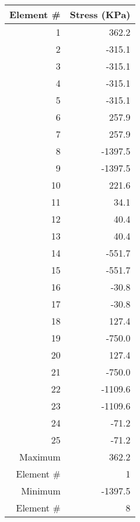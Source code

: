\documentclass{article}
\begin{document}
    \begin{table}
    \centering
    \begin{tabular}{@{} r r @{}}
    \toprule
    Element \# & Stress (KPa) \\
    \midrule

 1 &   362.2 \\
 2 &  -315.1 \\
 3 &  -315.1 \\
 4 &  -315.1 \\
 5 &  -315.1 \\
 6 &   257.9 \\
 7 &   257.9 \\
 8 & -1397.5 \\
 9 & -1397.5 \\
10 &   221.6 \\
11 &    34.1 \\
12 &    40.4 \\
13 &    40.4 \\
14 &  -551.7 \\
15 &  -551.7 \\
16 &   -30.8 \\
17 &   -30.8 \\
18 &   127.4 \\
19 &  -750.0 \\
20 &   127.4 \\
21 &  -750.0 \\
22 & -1109.6 \\
23 & -1109.6 \\
24 &   -71.2 \\
25 &   -71.2 \\
Maximum &   362.2 \\
Element \# &  1 \\
Minimum & -1397.5 \\
Element \# &  8 \\

    \bottomrule
\end{tabular}
    \end{table}
    
\end{document}

